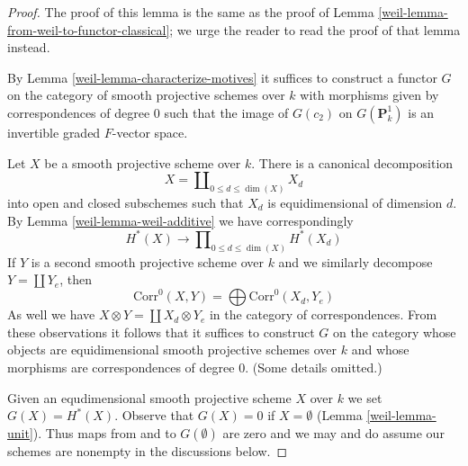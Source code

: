 \begin{proof}

The proof of this lemma is the same as the proof of
Lemma \ref{weil-lemma-from-weil-to-functor-classical};
we urge the reader to read the proof of that lemma instead.

\medskip\noindent
By Lemma \ref{weil-lemma-characterize-motives} it suffices to construct a functor
$G$ on the category of smooth projective schemes over $k$
with morphisms given by correspondences of degree $0$ such that
the image of $G(c_2)$ on $G(\mathbf{P}^1_k)$ is an invertible graded
$F$-vector space.

\medskip\noindent
Let $X$ be a smooth projective scheme over $k$. There is a canonical
decomposition
$$
X = \coprod\nolimits_{0 \leq d \le \dim(X)} X_d
$$
into open and closed subschemes such that $X_d$ is equidimensional
of dimension $d$. By Lemma \ref{weil-lemma-weil-additive} we have correspondingly
$$
H^*(X) \longrightarrow \prod\nolimits_{0 \leq d \le \dim(X)} H^*(X_d)
$$
If $Y$ is a second smooth projective scheme over $k$
and we similarly decompose $Y = \coprod Y_e$, then
$$
\text{Corr}^0(X, Y) = \bigoplus \text{Corr}^0(X_d, Y_e)
$$
As well we have $X \otimes Y = \coprod X_d \otimes Y_e$ in the
category of correspondences. From these observations it follows
that it suffices to construct $G$ on the category whose objects
are equidimensional smooth projective schemes over $k$
and whose morphisms are correspondences of degree $0$. (Some details
omitted.)

\medskip\noindent
Given an equdimensional smooth projective scheme
$X$ over $k$ we set $G(X) = H^*(X)$. Observe that $G(X) = 0$
if $X = \emptyset$ (Lemma \ref{weil-lemma-unit}). Thus maps
from and to $G(\emptyset)$ are zero and we may and do
assume our schemes are nonempty in the discussions below.


\end{proof}
